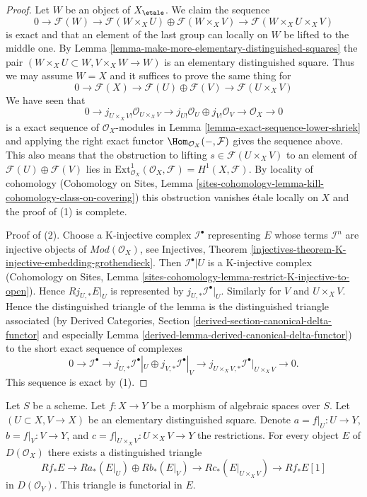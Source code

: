 \begin{proof}
Let $W$ be an object of $X_\etale$. We claim the sequence
$$
0 \to
\mathcal{F}(W) \to
\mathcal{F}(W \times_X U) \oplus \mathcal{F}(W \times_X V) \to
\mathcal{F}(W \times_X U \times_X V)
$$
is exact and that an element of the last group can locally on $W$
be lifted to the middle one.
By Lemma \ref{lemma-make-more-elementary-distinguished-squares}
the pair $(W \times_X U \subset W, V \times_X W \to W)$ is an elementary
distinguished square. Thus we may assume $W = X$ and it suffices
to prove the same thing for
$$
0 \to
\mathcal{F}(X) \to
\mathcal{F}(U) \oplus \mathcal{F}(V) \to
\mathcal{F}(U \times_X V)
$$
We have seen that
$$
0 \to j_{U \times_X V!}\mathcal{O}_{U \times_X V}
\to j_{U!}\mathcal{O}_U \oplus
j_{V!}\mathcal{O}_V \to
\mathcal{O}_X \to 0
$$
is a exact sequence of $\mathcal{O}_X$-modules in
Lemma \ref{lemma-exact-sequence-lower-shriek} and applying
the right exact functor $\Hom_{\mathcal{O}_X}(- , \mathcal{F})$
gives the sequence above. This also means that the obstruction
to lifting $s \in \mathcal{F}(U \times_X V)$ to
an element of $\mathcal{F}(U) \oplus \mathcal{F}(V)$ lies in
$\text{Ext}^1_{\mathcal{O}_X}(\mathcal{O}_X, \mathcal{F}) =
H^1(X, \mathcal{F})$. By locality of cohomology
(Cohomology on Sites, Lemma
\ref{sites-cohomology-lemma-kill-cohomology-class-on-covering})
this obstruction vanishes \'etale locally on $X$ and the proof
of (1) is complete.

\medskip\noindent
Proof of (2).
Choose a K-injective complex $\mathcal{I}^\bullet$ representing $E$
whose terms $\mathcal{I}^n$ are injective objects of
$\textit{Mod}(\mathcal{O}_X)$, see Injectives, Theorem
\ref{injectives-theorem-K-injective-embedding-grothendieck}.
Then $\mathcal{I}^\bullet|U$ is a K-injective complex
(Cohomology on Sites, Lemma
\ref{sites-cohomology-lemma-restrict-K-injective-to-open}).
Hence $Rj_{U, *}E|_U$ is represented by $j_{U, *}\mathcal{I}^\bullet|_U$.
Similarly for $V$ and $U \times_X V$. Hence the distinguished triangle
of the lemma is the distinguished triangle associated (by
Derived Categories, Section
\ref{derived-section-canonical-delta-functor} and especially
Lemma \ref{derived-lemma-derived-canonical-delta-functor})
to the short exact sequence of complexes
$$
0 \to
\mathcal{I}^\bullet \to
j_{U, *}\mathcal{I}^\bullet|_U \oplus j_{V, *}\mathcal{I}^\bullet|_V \to
j_{U \times_X V, *}\mathcal{I}^\bullet|_{U \times_X V} \to
0.
$$
This sequence is exact by (1).
\end{proof}

\begin{lemma}
\label{lemma-unbounded-relative-mayer-vietoris}
Let $S$ be a scheme. Let $f : X \to Y$ be a morphism of algebraic spaces
over $S$. Let $(U \subset X, V \to X)$ be an elementary distinguished square.
Denote $a = f|_U : U \to Y$, $b = f|_V : V \to Y$, and
$c = f|_{U \times_X V} : U \times_X V \to Y$ the restrictions.
For every object $E$ of $D(\mathcal{O}_X)$ there exists a
distinguished triangle
$$
Rf_*E \to
Ra_*(E|_U) \oplus Rb_*(E|_V) \to
Rc_*(E|_{U \times_X V}) \to
Rf_*E[1]
$$
in $D(\mathcal{O}_Y)$. This triangle is functorial in $E$.
\end{lemma}

